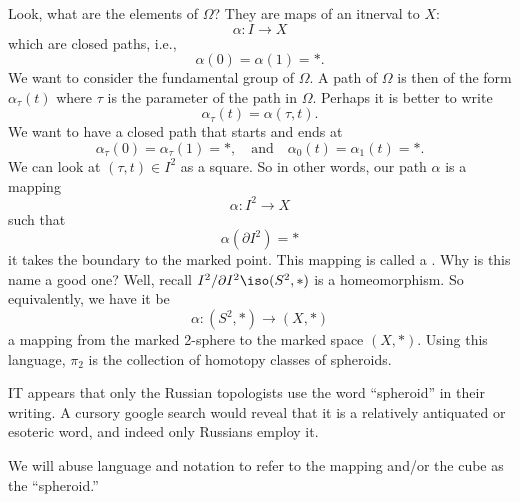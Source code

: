 %
Look, what are the elements of $\Omega$? They are maps of an
itnerval to $X$:
\begin{equation}
\alpha\colon I\to X
\end{equation}
which are closed paths, i.e.,
\begin{equation}
\alpha(0)=\alpha(1)=*.
\end{equation}
We want to consider the fundamental group of $\Omega$. A path of
$\Omega$ is then of the form $\alpha_{\tau}(t)$ where $\tau$ is
the parameter of the path in $\Omega$. Perhaps it is better to
write
\begin{equation}
\alpha_{\tau}(t)=\alpha(\tau,t).
\end{equation}
We want to have a closed path that starts and ends at
\begin{equation}
\alpha_{\tau}(0)=\alpha_{\tau}(1)=*,\quad\mbox{and}\quad
\alpha_{0}(t)=\alpha_{1}(t)=*.
\end{equation}
We can look at $(\tau,t)\in I^2$ as a square. So in other words,
our path $\alpha$ is a mapping
\begin{equation}
\alpha\colon I^{2}\to X
\end{equation}
such that
\begin{equation}
\alpha(\partial I^{2})=*
\end{equation}
it takes the boundary to the marked point. This mapping is called
a . Why is this name a good one?
Well, recall $I^{2}/\partial I^{2}\iso(S^{2},*)$ is a
homeomorphism. So equivalently, we have it be
\begin{equation}
\alpha\colon(S^2,*)\to(X,*)
\end{equation}
a mapping from the marked 2-sphere to the marked space
$(X,*)$. Using this language, $\pi_{2}$ is the
collection of homotopy classes of spheroids.

\begin{rmk}
IT appears that only the Russian topologists use the word
``spheroid'' in their writing. A cursory google search would
reveal that it is a relatively antiquated or esoteric word, and
indeed only Russians employ it.
\end{rmk}
\begin{ddanger}
We will abuse language and notation to refer to the mapping
and/or the cube as the ``spheroid.''
\end{ddanger}

